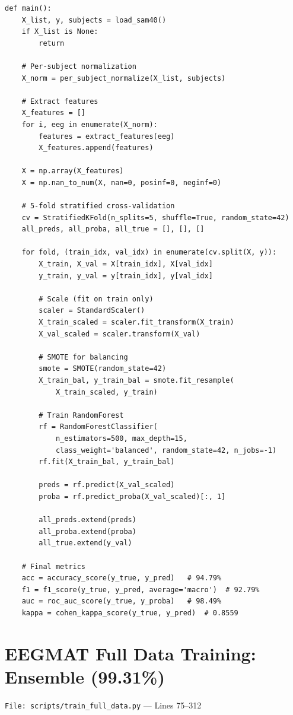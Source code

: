 \documentclass[11pt,a4paper]{article}
\begin{document}
\begin{lstlisting}[caption={SAM-40 balanced training achieving 94.79\% accuracy}]
def main():
    X_list, y, subjects = load_sam40()
    if X_list is None:
        return

    # Per-subject normalization
    X_norm = per_subject_normalize(X_list, subjects)

    # Extract features
    X_features = []
    for i, eeg in enumerate(X_norm):
        features = extract_features(eeg)
        X_features.append(features)

    X = np.array(X_features)
    X = np.nan_to_num(X, nan=0, posinf=0, neginf=0)

    # 5-fold stratified cross-validation
    cv = StratifiedKFold(n_splits=5, shuffle=True, random_state=42)
    all_preds, all_proba, all_true = [], [], []

    for fold, (train_idx, val_idx) in enumerate(cv.split(X, y)):
        X_train, X_val = X[train_idx], X[val_idx]
        y_train, y_val = y[train_idx], y[val_idx]

        # Scale (fit on train only)
        scaler = StandardScaler()
        X_train_scaled = scaler.fit_transform(X_train)
        X_val_scaled = scaler.transform(X_val)

        # SMOTE for balancing
        smote = SMOTE(random_state=42)
        X_train_bal, y_train_bal = smote.fit_resample(
            X_train_scaled, y_train)

        # Train RandomForest
        rf = RandomForestClassifier(
            n_estimators=500, max_depth=15,
            class_weight='balanced', random_state=42, n_jobs=-1)
        rf.fit(X_train_bal, y_train_bal)

        preds = rf.predict(X_val_scaled)
        proba = rf.predict_proba(X_val_scaled)[:, 1]

        all_preds.extend(preds)
        all_proba.extend(proba)
        all_true.extend(y_val)

    # Final metrics
    acc = accuracy_score(y_true, y_pred)   # 94.79%
    f1 = f1_score(y_true, y_pred, average='macro')  # 92.79%
    auc = roc_auc_score(y_true, y_proba)   # 98.49%
    kappa = cohen_kappa_score(y_true, y_pred)  # 0.8559
\end{lstlisting}

\section{EEGMAT Full Data Training: Ensemble (99.31\%)}
\texttt{File: scripts/train\_full\_data.py} --- Lines 75--312
\end{document}
